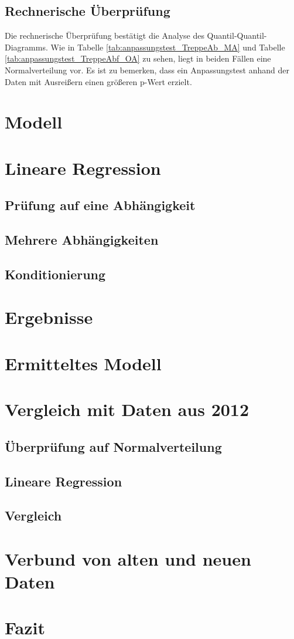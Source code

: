 \subsection{Rechnerische Überprüfung}
Die rechnerische Überprüfung bestätigt die Analyse des Quantil-Quantil-Diagramms. Wie in Tabelle \ref{tab:anpassungstest_TreppeAb_MA} und Tabelle \ref{tab:anpassungstest_TreppeAbf_OA} zu sehen, liegt in beiden Fällen eine Normalverteilung vor. Es ist zu bemerken, dass ein Anpassungstest anhand der Daten mit Ausreißern einen größeren p-Wert erzielt. 


\section{Modell}
\section{Lineare Regression}
\subsection{Prüfung auf eine Abhängigkeit}
\subsection{Mehrere Abhängigkeiten}
\subsection{Konditionierung}

\section{Ergebnisse}
\section{Ermitteltes Modell}

\section{Vergleich mit Daten aus 2012}
\subsection{Überprüfung auf Normalverteilung}
\subsection{Lineare Regression}
\subsection{Vergleich}

\section{Verbund von alten und neuen Daten}

\section{Fazit}


